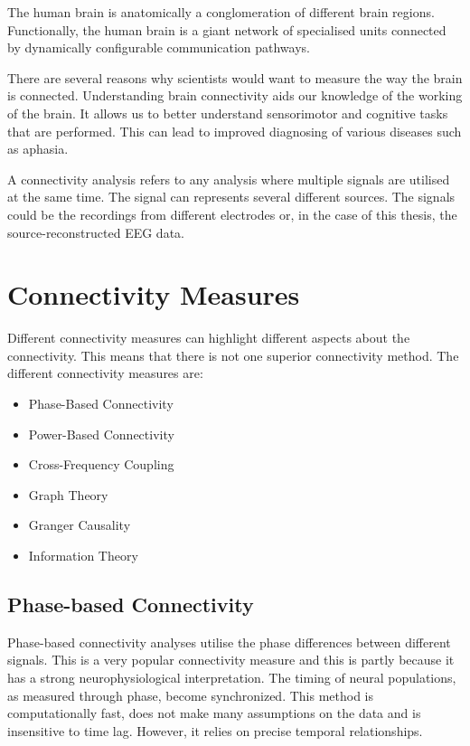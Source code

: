 The human brain is anatomically a conglomeration of different brain regions. Functionally, the human brain is a giant network of specialised units connected by dynamically configurable communication pathways. \cite{faes2012methodological}

There are several reasons why scientists would want to measure the way the brain is connected. Understanding brain connectivity aids our knowledge of the working of the brain. It allows us to better understand sensorimotor and cognitive tasks that are performed. This can lead to improved diagnosing of various diseases such as aphasia. \cite{horwitz2003elusive}

A connectivity analysis refers to any analysis where multiple signals are utilised at the same time. The signal can represents several different sources. The signals could be the recordings from different electrodes or, in the case of this thesis, the source-reconstructed EEG data. 

\section{Connectivity Measures}

Different connectivity measures can highlight different aspects about the connectivity. This means that there is not one superior connectivity method. The different connectivity measures are: \cite{friston2011functional, cohen2014analyzing}

\begin{itemize}
\item Phase-Based Connectivity
\item Power-Based Connectivity
\item Cross-Frequency Coupling
\item Graph Theory
\item Granger Causality
\item Information Theory
\end{itemize}

\subsection{Phase-based Connectivity}

Phase-based connectivity analyses utilise the phase differences between different signals. This is a very popular connectivity measure and this is partly because it has a strong neurophysiological interpretation. The timing of neural populations, as measured through phase, become synchronized. This method is computationally fast, does not make many assumptions on the data and is insensitive to time lag. However, it relies on precise temporal relationships.

